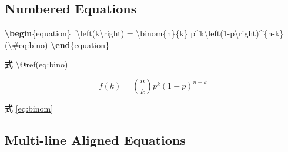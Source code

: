 \documentclass[oneside]{book}
\newenvironment{Shaded}{\begin{snugshade}}{\end{snugshade}}
\newcommand{\ExtensionTok}[1]{#1}
\newcommand{\FunctionTok}[1]{\textcolor[rgb]{0.00,0.00,0.00}{#1}}
\newcommand{\KeywordTok}[1]{\textcolor[rgb]{0.13,0.29,0.53}{\textbf{#1}}}
\newcommand{\NormalTok}[1]{#1}
\newcommand{\SpecialCharTok}[1]{\textcolor[rgb]{0.00,0.00,0.00}{#1}}
\newcommand{\SpecialStringTok}[1]{\textcolor[rgb]{0.31,0.60,0.02}{#1}}
\theoremstyle{definition}
\theoremstyle{definition}
\theoremstyle{definition}
\theoremstyle{remark}
\begin{document}
\hypertarget{numbered-equations}{%
\subsection{Numbered Equations}\label{numbered-equations}}

\begin{Shaded}
\begin{Highlighting}[]
\KeywordTok{\textbackslash{}begin}\NormalTok{\{}\ExtensionTok{equation}\NormalTok{\}}\SpecialStringTok{ }
\SpecialStringTok{  f}\SpecialCharTok{\textbackslash{}left}\SpecialStringTok{(k}\SpecialCharTok{\textbackslash{}right}\SpecialStringTok{) = }\SpecialCharTok{\textbackslash{}binom}\SpecialStringTok{\{n\}\{k\} p^k}\SpecialCharTok{\textbackslash{}left}\SpecialStringTok{(1-p}\SpecialCharTok{\textbackslash{}right}\SpecialStringTok{)^\{n-k\}}
\SpecialStringTok{  (}\SpecialCharTok{\textbackslash{}#}\SpecialStringTok{eq:bino)}
\KeywordTok{\textbackslash{}end}\NormalTok{\{}\ExtensionTok{equation}\NormalTok{\} }

\NormalTok{式 }\FunctionTok{\textbackslash{}@ref}\NormalTok{(eq:bino)}
\end{Highlighting}
\end{Shaded}

\begin{equation} 
  f\left(k\right) = \binom{n}{k} p^k\left(1-p\right)^{n-k}
  \label{eq:binom}
\end{equation}

式 \eqref{eq:binom}

\hypertarget{multi-line-aligned-equations}{%
\subsection{Multi-line Aligned Equations}\label{multi-line-aligned-equations}}
\end{document}
